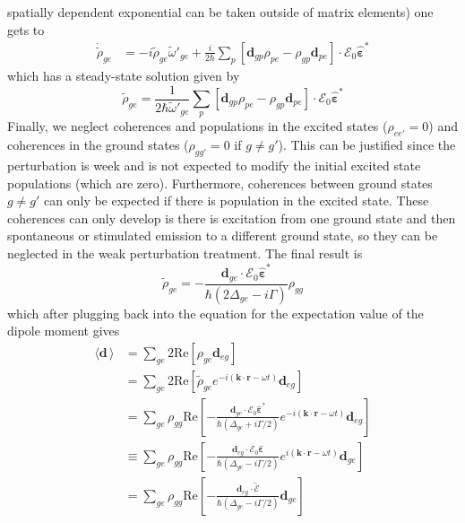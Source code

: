 \documentclass[11pt,letter]{article}
\newcommand{\bv}[1]{\ensuremath{\bm{#1}}}
\newcommand{\efield}{\ensuremath{\bv{\mathcal{E}}}}
\newcommand{\efieldo}{\ensuremath{\mathcal{E}_{0}}}
\newcommand{\epspol}{\ensuremath{\hat{\bv{\varepsilon}}}}
\begin{document}
spatially dependent exponential can be taken outside of matrix elements) one
gets to 
\begin{equation} 
\begin{split}
  \dot{\tilde{\rho}}_{ge} & =  
     -i \tilde{\rho}_{ge}\tilde{\omega}'_{ge}   
     + \frac{i}{2\hbar} \sum_{p}\left[ \bv{d}_{gp} \rho_{pe} 
     - \rho_{gp}\bv{d}_{pe}\right] \cdot \efieldo \epspol^{*}
\end{split} 
\end{equation}
which has a steady-state solution given by 
\begin{equation} 
  \tilde{\rho}_{ge}  = \frac{1}{2 \hbar\tilde{\omega}'_{ge} }  
       \sum_{p}\left[ \bv{d}_{gp} \rho_{pe} 
     - \rho_{gp}\bv{d}_{pe}\right] \cdot \efieldo \epspol^{*}
\end{equation}
Finally, we neglect coherences and populations in the excited states
($\rho_{ee'}=0$) and coherences in the ground states ($\rho_{gg'}=0$ if $g\neq
g'$).   This can be justified since the perturbation is week and is not
expected to modify the initial excited state populations (which are zero).
Furthermore, coherences between ground states $g\neq g'$ can only be expected
if there is  population in the excited state.  These coherences
can only develop is there is excitation from one ground state and then
spontaneous or stimulated emission to a different ground state, so they
can be neglected in the weak perturbation treatment.  The final result is 
\begin{equation} 
  \tilde{\rho}_{ge} 
  =  -\frac{\bv{d}_{ge} \cdot \efieldo \epspol^{*}  }
       {\hbar (2 \Delta_{ge} - i \Gamma )} \rho_{gg} 
\end{equation}
which after plugging back into the equation for the expectation value of the dipole
moment gives 
\begin{equation}
\begin{split}
   \langle \bv{d}\, \rangle 
   & = \sum_{ge} 2 \text{Re}[ \rho_{ge} \bv{d}_{eg} ] \\
   & = \sum_{ge} 2 \text{Re}[ \tilde{\rho}_{ge}e^{-i(\bv{k}\cdot\bv{r}-\omega t)}\bv{d}_{eg} ]   \\
   & = \sum_{ge} \rho_{gg}\text{Re}[ 
 -\frac{\bv{d}_{ge} \cdot \efieldo \epspol^{*} }{ \hbar( \Delta_{ge} + i \Gamma/2 )} 
   e^{-i(\bv{k}\cdot\bv{r} - \omega t) } 
 \bv{d}_{eg} ]   \\
   & \equiv \sum_{ge}  \rho_{gg} \text{Re}[ 
 -\frac{\bv{d}_{eg} \cdot \efieldo \epspol }{ \hbar( \Delta_{ge} -i \Gamma/2 ) } 
   e^{i(\bv{k}\cdot\bv{r} - \omega t) } 
 \bv{d}_{ge} ]   \\
   & = \sum_{ge}  \rho_{gg}  \text{Re}[ 
 -\frac{\bv{d}_{eg} \cdot \tilde{\efield} }{ \hbar(  \Delta_{ge} -i \Gamma/2 ) } 
 \bv{d}_{ge} ]   \\
\end{split} 
\end{equation}
\end{document}
